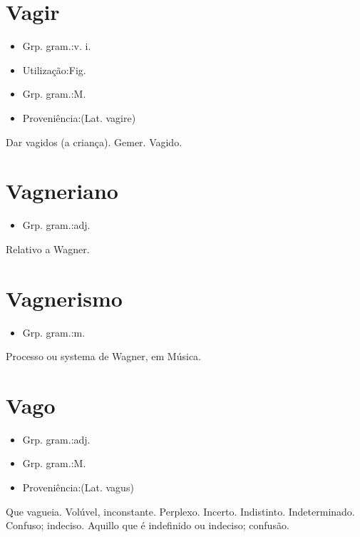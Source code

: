 \documentclass{article}
\begin{document}
\section{Vagir}
\begin{itemize}
\item {Grp. gram.:v. i.}
\end{itemize}
\begin{itemize}
\item {Utilização:Fig.}
\end{itemize}
\begin{itemize}
\item {Grp. gram.:M.}
\end{itemize}
\begin{itemize}
\item {Proveniência:(Lat. \textunderscore vagire\textunderscore )}
\end{itemize}
Dar vagidos (a criança).
Gemer.
Vagido.
\section{Vagneriano}
\begin{itemize}
\item {Grp. gram.:adj.}
\end{itemize}
Relativo a Wagner.
\section{Vagnerismo}
\begin{itemize}
\item {Grp. gram.:m.}
\end{itemize}
Processo ou systema de Wagner, em Música.
\section{Vago}
\begin{itemize}
\item {Grp. gram.:adj.}
\end{itemize}
\begin{itemize}
\item {Grp. gram.:M.}
\end{itemize}
\begin{itemize}
\item {Proveniência:(Lat. \textunderscore vagus\textunderscore )}
\end{itemize}
Que vagueia.
Volúvel, inconstante.
Perplexo.
Incerto.
Indistinto.
Indeterminado.
Confuso; indeciso.
Aquillo que é indefinido ou indeciso; confusão.
\end{document}
